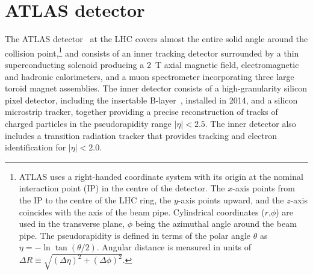 \section{ATLAS detector}
\label{sec:detector}

The ATLAS detector~\cite{PERF-2007-01} at the LHC covers almost the entire solid angle around the collision point,\footnote{ATLAS 
uses a right-handed coordinate system with its origin at the nominal interaction point (IP) in the 
centre of the detector.  
The $x$-axis points from
the IP to the centre of the LHC ring, %
the $y$-axis points upward,
and the $z$-axis coincides with the axis of the beam pipe.
Cylindrical coordinates ($r$,$\phi$) are used 
in the transverse plane, $\phi$ being the azimuthal angle around the beam pipe. The pseudorapidity is defined in 
terms of the polar angle $\theta$ as $\eta = - \ln \tan(\theta/2)$.
Angular distance is measured in units of $\Delta R\equiv \sqrt{(\Delta\eta)^2+(\Delta\phi)^2}$.} and
consists of an inner tracking detector surrounded by a thin superconducting solenoid producing a
2~T axial magnetic field, electromagnetic and hadronic calorimeters, and a muon spectrometer
incorporating three large toroid magnet assemblies. The inner detector consists of a high-granularity silicon pixel detector, 
including the %
insertable B-layer~\cite{IBL}, installed in 2014,
and a silicon microstrip tracker,
together providing a precise reconstruction of tracks of charged particles in the pseudorapidity range $|\eta|<2.5$.
The inner detector also includes a transition radiation tracker that provides tracking and electron identification for $|\eta|<2.0$.
